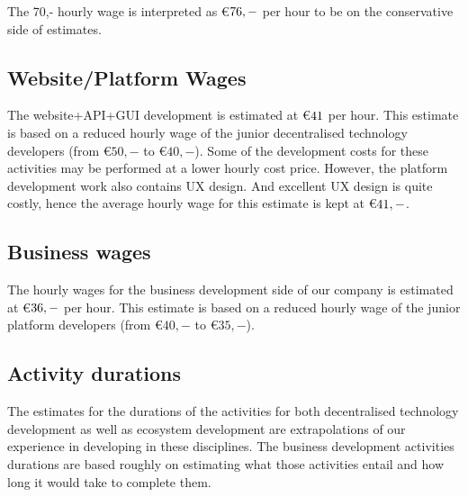 The 70,- hourly wage is interpreted as \euro$76,-$ per hour to be on the conservative side of estimates.
\subsection{Website/Platform Wages}
The website+API+GUI development is estimated at \euro$41$ per hour. This estimate is based on a reduced hourly wage of the junior decentralised technology developers (from \euro$50,-$ to \euro$40,-$). Some of the development costs for these activities may be performed at a lower hourly cost price. However, the platform development work also contains UX design. And excellent UX design is quite costly, hence the average hourly wage for this estimate is kept at \euro$41,-$.

\subsection{Business wages}
The hourly wages for the business development side of our company is estimated at \euro$36,-$ per hour. This estimate is based on a reduced hourly wage of the junior platform developers (from \euro$40,-$ to \euro$35,-$).

\subsection{Activity durations}
The estimates for the durations of the activities for both decentralised technology development as well as ecosystem development are extrapolations of our experience in developing in these disciplines. The business development activities durations are based roughly on estimating what those activities entail and how long it would take to complete them.
